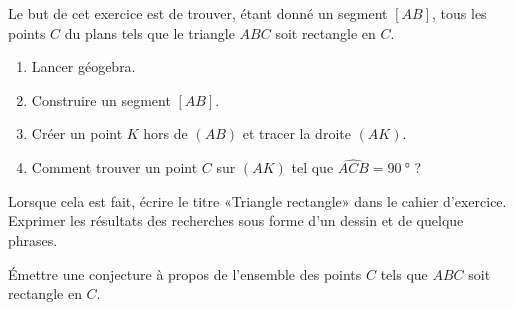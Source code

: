 
\begin{exercice}\label{exosmath-0900}

    Le but de cet exercice est de trouver, étant donné un segment \( [AB]\), tous les points \( C\) du plans tels que le triangle \( ABC\) soit rectangle en \( C\).
    \begin{enumerate}
        \item
            Lancer géogebra.
        \item
            Construire un segment \( [AB]\).
        \item
            Créer un point \( K\) hors de \( (AB)\) et tracer la droite \( (AK)\).
        \item
            Comment trouver un point \( C\) sur \( (AK)\) tel que \( \widehat{ACB}=\SI{90}{\degree}\) ?
    \end{enumerate}

    Lorsque cela est fait, écrire le titre «Triangle rectangle» dans le cahier d'exercice. Exprimer les résultats des recherches sous forme d'un dessin et de quelque phrases. 

    Émettre une conjecture à propos de l'ensemble des points \( C\) tels que \( ABC\) soit rectangle en \( C\).

\end{exercice}
